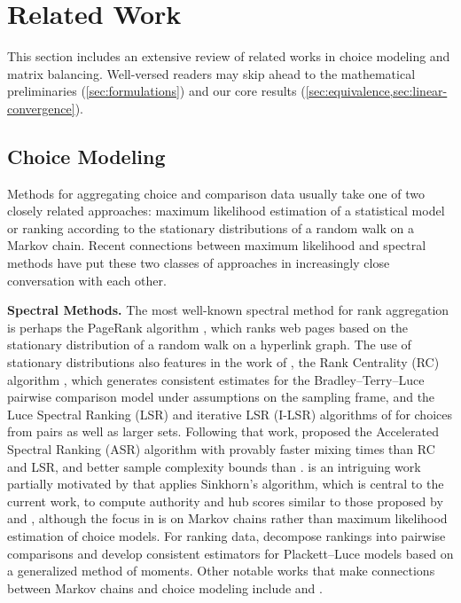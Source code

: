 \section{Related Work}
\label{sec:related-works}
This section includes an extensive review of related works in choice modeling and matrix balancing. Well-versed readers may skip ahead to the mathematical preliminaries (\cref{sec:formulations}) and our core results (\cref{sec:equivalence,sec:linear-convergence}).
\subsection{Choice Modeling}
Methods for aggregating choice and comparison data usually take one of two closely related approaches: maximum likelihood estimation of a statistical model or ranking according to the stationary distributions of a random walk on a Markov chain. Recent connections between maximum likelihood and spectral methods have put these two classes of approaches in increasingly close conversation with each other.

\textbf{Spectral Methods.}
The most well-known spectral method for rank aggregation is perhaps
the PageRank algorithm \citep{page1999pagerank}, which ranks web pages
based on the stationary distribution of a random walk on a
hyperlink graph. The use of stationary distributions also features in the work of \citet{dwork2001rank}, the Rank Centrality (RC) algorithm \citep{negahban2012iterative,negahban2016rank}, which generates consistent estimates for the Bradley--Terry--Luce
pairwise comparison model under assumptions on the sampling frame, and the Luce Spectral Ranking (LSR) and iterative LSR (I-LSR) algorithms of \citet{maystre2015fast} for choices from pairs as well as larger sets. Following that work, \citet{agarwal2018accelerated} proposed the Accelerated Spectral Ranking (ASR) algorithm with provably faster mixing times than RC and LSR, and better sample complexity bounds than \citet{negahban2016rank}.
\citet{knight2008sinkhorn} is an intriguing work partially motivated by \citet{page1999pagerank} that applies Sinkhorn's algorithm, which is central to the current work, to compute authority and hub scores similar to
those proposed by \citet{kleinberg1999authoritative} and \citet{tomlin2003new}, although the focus in \citet{knight2008sinkhorn} is on Markov chains rather than maximum likelihood estimation of choice models.
For ranking data, \citet{soufiani2013generalized} decompose rankings into pairwise comparisons and develop consistent estimators for Plackett--Luce models based on a generalized method of moments. Other notable works that make connections between Markov chains and 
choice modeling include \citet{blanchet2016markov} and \citet{ragain2016pairwise}.

